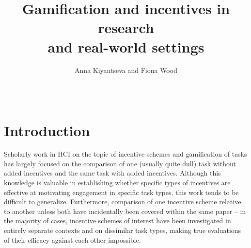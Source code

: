 \documentclass{sigchi}
\begin{document}
\title{Gamification and incentives in research \\ and real-world settings}

\author{
  \alignauthor Anna Kiyantseva and Fiona Wood\\
    \\
    \\
    }


\maketitle

\begin{abstract}

\end{abstract}




\section{Introduction}

Scholarly work in HCI on the topic of incentive schemes and gamification of tasks has largely focused on the comparison of one (usually quite dull) task without added incentives and the same task with added incentives. Although this knowledge is valuable in establishing whether specific types of incentives are effective at motivating engagement in specific task types, this work tends to be difficult to generalize. Furthermore, comparison of one incentive scheme relative to another unless both have incidentally been covered within the same paper -- in the majority of cases, incentive schemes of interest have been investigated in entirely separate contexts and on dissimilar task types, making true evaluations of their efficacy against each other impossible.
\end{document}
